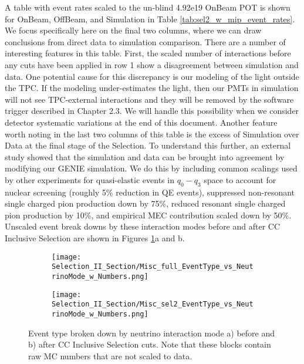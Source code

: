 A table with event rates scaled to the un-blind 4.92e19 OnBeam POT is shown for OnBeam, OffBeam, and Simulation in Table \ref{tab:sel2_w_mip_event_rates}. We focus specifically here on the final two columns, where we can draw conclusions from direct data to simulation comparison. There are a number of interesting features in this table.  First, the scaled number of interactions before any cuts have been applied in row 1 show a disagreement between simulation and data.  One potential cause for this discrepancy is our modeling of the light outside the TPC.  If the modeling under-estimates the light, then our PMTs in simulation will not see TPC-external interactions and they will be removed by the software trigger described in Chapter 2.3. We will handle this possibility when we consider detector systematic variations at the end of this document.  Another feature worth noting in the last two columns of this table is the excess of Simulation over Data at the final stage of the Selection. To understand this further, an external study showed that the simulation and data can be brought into agreement by modifying our GENIE simulation. We do this by including common scalings used by other experiments for quasi-elastic events in $q_0 - q_3$ space to account for nuclear screening (roughly 5\% reduction in QE events), suppressed non-resonant single charged pion production down by 75\%, reduced resonant single charged pion production by 10\%, and empirical MEC contribution scaled down by 50\%. Unscaled event break downs by these interaction modes before and after CC Inclusive Selection are shown in Figures \ref{fig:physics_sel2_inttype}a and b.  


\begin{figure}[t!]
\centering
  \begin{subfigure}[t]{0.35\textwidth}
    \centering
\texttt{[image: Selection\_II\_Section/Misc\_full\_EventType\_vs\_NeutrinoMode\_w\_Numbers.png]}
    \caption{ }
  \end{subfigure} 
  \hspace{20 mm}
  \begin{subfigure}[t]{0.35\textwidth}
    \centering
\texttt{[image: Selection\_II\_Section/Misc\_sel2\_EventType\_vs\_NeutrinoMode\_w\_Numbers.png]}
    \caption{ }
  \end{subfigure} 
\caption{ Event type broken down by neutrino interaction mode a) before and b) after CC Inclusive Selection cuts. Note that these blocks contain raw MC numbers that are not scaled to data. }
\label{fig:physics_sel2_inttype}
\end{figure}



